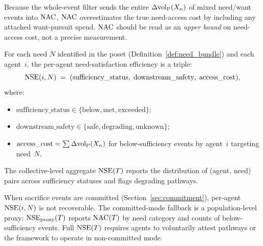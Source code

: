 \begin{remark}
\label{rem:nac_upper_bound}
Because the whole-event filter sends the entire
$\Delta{\operatorname{vol}_{\mathrm{P}}}(X_n)$ of mixed need/want events into $\mathrm{NAC}$,
$\mathrm{NAC}$ overestimates the true need-access cost by including any
attached want-pursuit spend.  $\mathrm{NAC}$ should be read as an
\emph{upper bound} on need-access cost, not a precise
measurement.
\end{remark}

\begin{definition}
\label{def:nse}
For each need $N$ identified in the poset
(Definition~\ref{def:need_bundle}) and each agent~$i$, the
per-agent need-satisfaction efficiency is a triple:
\[
  \mathrm{NSE}(i, N) \;=\; (\mathrm{sufficiency\_status},\;
  \mathrm{downstream\_safety},\; \mathrm{access\_cost}),
\]
where:
\begin{itemize}
\item $\mathrm{sufficiency\_status} \in
  \{\text{below}, \text{met}, \text{exceeded}\}$;
\item $\mathrm{downstream\_safety} \in
  \{\text{safe}, \text{degrading}, \text{unknown}\}$;
\item $\mathrm{access\_cost} = \sum \Delta{\operatorname{vol}_{\mathrm{P}}}(X_n)$ for
  below-sufficiency events by agent~$i$ targeting need~$N$.
\end{itemize}
The collective-level aggregate $\mathrm{NSE}(T)$ reports the distribution
of (agent, need) pairs across sufficiency statuses and flags
degrading pathways.
\end{definition}

\begin{remark}
When sacrifice events are committed
(Section~\ref{sec:commitment}), per-agent $\mathrm{NSE}(i, N)$ is not
recoverable.  The committed-mode fallback is a population-level
proxy: $\mathrm{NSE}_{\mathrm{proxy}}(T)$ reports $\mathrm{NAC}(T)$ by need
category and counts of below-sufficiency events.  Full $\mathrm{NSE}(T)$
requires agents to voluntarily attest pathways or the framework to
operate in non-committed mode.
\end{remark}

